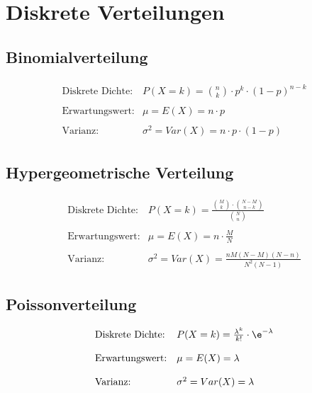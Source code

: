 \section{Diskrete Verteilungen}

\subsection{Binomialverteilung}
\begin{align*}
\begin{array}{ll}
\mbox{Diskrete Dichte:} & P(X=k) = {n \choose k} \cdot p^k \cdot (1-p)^{n-k} \\
{} & {} \\
\mbox{Erwartungswert:} & \mu = E(X) = n \cdot p \\
{} & {} \\
\mbox{Varianz:} & \sigma^2 = Var(X) = n \cdot p \cdot (1-p)
\end{array}
\end{align*}

\subsection{Hypergeometrische Verteilung}
\begin{align*}
\begin{array}{ll}
\mbox{Diskrete Dichte:} & P(X=k) = \frac{{M \choose k} \cdot {N-M \choose n-k}}{{N \choose n}} \\
{} & {} \\
\mbox{Erwartungswert:} & \mu = E(X) = n \cdot \frac{M}{N} \\
{} & {} \\
\mbox{Varianz:} & \sigma^2 = Var(X) = \frac{nM(N-M)(N-n)}{N^2(N-1)}
\end{array}
\end{align*}

\subsection{Poissonverteilung}
\begin{align*}
\begin{array}{ll}
\mbox{Diskrete Dichte:} & P(X=k) = \frac{\lambda^k}{k !} \cdot \e^{-\lambda}\\
{} & {} \\
\mbox{Erwartungswert:} & \mu = E(X) = \lambda \\
{} & {} \\
\mbox{Varianz:} & \sigma^2 = Var(X) =  \lambda
\end{array}
\end{align*}

